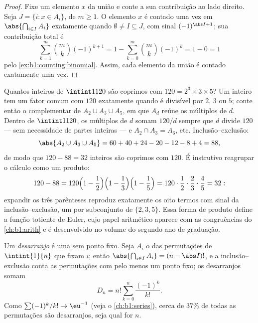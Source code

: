 \begin{proof}
Fixe um elemento $x$ da união e conte a sua contribuição ao
lado direito. Seja $J = \{i : x \in A_i\}$, de  $m \geq
1$. O elemento $x$ é contado uma vez em $\abs{\bigcap_{i \in I} A_i}$
exatamente quando $\emptyset \neq I \subseteq J$, com sinal
$(-1)^{\abs I + 1}$; sua contribuição total é
\[
\sum_{k=1}^{m} \binom{m}{k} (-1)^{k+1}
= 1 - \sum_{k=0}^{m} \binom mk (-1)^k = 1 - 0 = 1
\]
pelo \cref{ex:b1:counting:binomial}. Assim, cada elemento da união é
contado exatamente uma vez.
\end{proof}

\begin{example}\label{ex:b1:counting:coprime}
Quantos inteiros de $\intint1{120}$ são coprimos com $120 = 2^3
\times 3 \times 5$? Um inteiro tem um fator comum com $120$ exatamente
quando é divisível por $2$, $3$ ou $5$; conte então o complementar
de $A_2 \cup A_3 \cup A_5$, em que $A_d$ reúne os múltiplos de
$d$. Dentro de $\intint1{120}$, os múltiplos de $d$ somam $120/d$
sempre que $d$ divide $120$ --- sem necessidade de partes inteiras --- e
$A_2 \cap A_3 = A_6$, etc. Inclusão--exclusão:
\[
\abs{A_2 \cup A_3 \cup A_5}
= 60 + 40 + 24 - 20 - 12 - 8 + 4 = 88 ,
\]
de modo que $120 - 88 = 32$ inteiros são coprimos com $120$. É
instrutivo reagrupar o cálculo como um produto:
\[
120 - 88 = 120\Bigl(1 - \frac12\Bigr)\Bigl(1 -
\frac13\Bigr)\Bigl(1 - \frac15\Bigr) = 120 \cdot \frac12 \cdot
\frac23 \cdot \frac45 = 32 :
\]
expandir os três parênteses reproduz exatamente os oito
termos com sinal da inclusão--exclusão, um por subconjunto de $\{2, 3,
5\}$. Essa forma de produto define a função totiente de Euler, cujo
papel aritmético aparece com as congruências do \cref{ch:b1:arith} e é
desenvolvido no volume do segundo ano de graduação.
\end{example}

\begin{example}[Desarranjos]\label{ex:b1:counting:derangement}
Um \emph{desarranjo} é uma  sem ponto fixo. Seja $A_i$
o  das permutações de $\intint{1}{n}$ que fixam $i$;
então $\abs{\bigcap_{i \in I} A_i} = (n - \abs I)!$, e a
inclusão--exclusão conta as permutações com pelo menos um ponto
fixo; os desarranjos somam
\[
D_n = n! \sum_{k=0}^{n} \frac{(-1)^k}{k!} .
\]
Como $\sum (-1)^k / k! \to \eu^{-1}$ (veja o \cref{ch:b1:series}), cerca de
$37\%$ de todas as permutações são desarranjos, seja qual for $n$.
\end{example}

